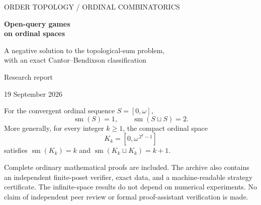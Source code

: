 \documentclass[11pt,letterpaper]{article}
\numberwithin{equation}{section}
\theoremstyle{definition}
\theoremstyle{remark}
\newcommand{\sm}{\operatorname{sm}}
\begin{document}
\hypersetup{pageanchor=false}
\begin{titlepage}
\vspace*{0.4in}
{\sffamily\color{Teal}\large ORDER TOPOLOGY \; / \; ORDINAL COMBINATORICS\par}
\vspace{0.45in}
{\sffamily\bfseries\color{Navy}\Huge Open-query games\\[0.15em] on ordinal spaces\par}
\vspace{0.3in}
{\sffamily\color{Navy}\Large A negative solution to the topological-sum problem,\\
with an exact Cantor--Bendixson classification\par}
\vspace{0.5in}
{\large Research report\par}
{\color{Gray}19 September 2026\par}
\vspace{0.45in}
\begin{resultbox}
For the convergent ordinal sequence $S=[0,\omega]$,
\[
 \sm(S)=1,
 \qquad
 \sm(S\sqcup S)=2.
\]
More generally, for every integer $k\geq1$, the compact ordinal space
\[
 K_k=[0,\omega^{\,2^k-1}]
\]
satisfies $\sm(K_k)=k$ and $\sm(K_k\sqcup K_k)=k+1$.
\end{resultbox}
\vfill
{\small\color{Gray}
Complete ordinary mathematical proofs are included. The archive also contains
an independent finite-poset verifier, exact data, and a machine-readable strategy
certificate. The infinite-space results do not depend on numerical experiments.
No claim of independent peer review or formal proof-assistant verification is made.\par}
\end{titlepage}
\hypersetup{pageanchor=true}
\end{document}
